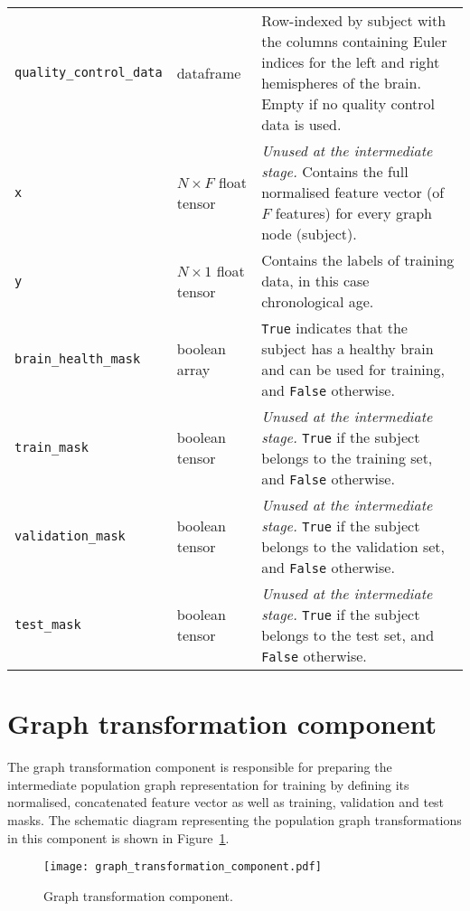 \begin{center}
\begin{longtable}[]{lp{}p{}}
    \texttt{quality\_control\_data} & dataframe & Row-indexed by subject with the columns containing Euler indices for the left and right hemispheres of the brain. Empty if no quality control data is used. \\
    \texttt{x} & $N \times F$ \hfill\newline float tensor & \textit{Unused at the intermediate stage.} Contains the full normalised feature vector (of $F$ features) for every graph node (subject). \\
    \texttt{y} & $N \times 1$ \hfill \newline float tensor & Contains the labels of training data, in this case chronological age. \\
    \texttt{brain\_health\_mask} & boolean array & \texttt{True} indicates that the subject has a healthy brain and can be used for training, and \texttt{False} otherwise. \\
    \texttt{train\_mask} & boolean tensor & \textit{Unused at the intermediate stage.} \texttt{True} if the subject belongs to the training set, and \texttt{False} otherwise. \\
    \texttt{validation\_mask} & boolean tensor & \textit{Unused at the intermediate stage.} \texttt{True} if the subject belongs to the validation set, and \texttt{False} otherwise. \\
    \texttt{test\_mask} & boolean tensor & \textit{Unused at the intermediate stage.} \texttt{True} if the subject belongs to the test set, and \texttt{False} otherwise.
\end{longtable}
\end{center}

\section{Graph transformation component}

The graph transformation component is responsible for preparing the intermediate population graph representation for training by defining its normalised, concatenated feature vector as well as training, validation and test masks. The schematic diagram representing the population graph transformations in this component is shown in Figure~\ref{graph-transformation-component}.

\begin{figure}[h]
    \centering
    \texttt{[image: graph\_transformation\_component.pdf]}
    \caption{Graph transformation component.}\label{graph-transformation-component}
\end{figure}

